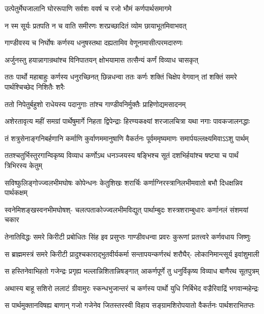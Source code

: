 \twolineshloka
{उत्पेतुर्मेघजालानि घोररूपाणि सर्वशः}
{ववर्ष च रजो भौमं कर्णपार्थसमागमे}


\twolineshloka
{न स्म सूर्यः प्रतपति न च वाति समीरणः}
{शरप्रच्छादितं व्योम छायाभूतमिवाभवत्}


\twolineshloka
{गाण्डीवस्य च निर्घोषः कर्णस्य धनुषस्तथा}
{दह्यतामिव वेणूनामासीत्परमदारुणः}


\twolineshloka
{अर्जुनस्तु हयान्नागान्रथांश्च विनिपातयन्}
{क्षोभयामास तत्सैन्यं कर्णं विव्याध चासकृत्}


\threelineshloka
{ततः पार्थो महाबाहुः कर्णस्य धनुरच्छिनत्}
{छिन्नधन्वा ततः कर्णः शक्तिं चिक्षेप वेगवान्}
{तां शक्तिं समरे पार्थश्चिच्छेद निशितैः शरैः}


\twolineshloka
{ततो निपेतुर्बहुशो राधेयस्य पदानुगाः}
{तांश्च गाण्डीवनिर्मुक्तैः प्राहिणोद्यमसादनम्}


\fourlineindentedshloka
{अशेरतावृत्य महीं समग्रां}
{पार्थेषुमार्गे निहता द्विपेन्द्राः}
{हिरण्यकक्ष्यां शरजालचित्रा}
{यथा नगाः पावकजालनद्धाः}


\fourlineindentedshloka
{तं शत्रुसेनाङ्गनिबर्हणानि}
{कर्माणि कुर्वाणममानुषाणि}
{वैकर्तनः पूर्वममृष्यमाणः}
{समार्पयल्लक्ष्यमिवाऽऽशु पार्थम्}


\fourlineindentedshloka
{ततश्चतुर्भिस्तुरगान्विकृष्य}
{विव्याध कर्णोऽथ धनञ्जयस्य}
{षङ्भिश्च सूतं दशभिर्हयांश्च}
{षष्ट्या च पार्थं त्रिभिरस्य केतुम्}


\fourlineindentedshloka
{सविष्फुलिङ्गोज्ज्वलभीमघोषः}
{कोपेन्धनः केतुशिखः शरार्चिः}
{कर्णाग्निरस्त्रानिलभीमवातो}
{बभौ दिधक्षन्निव पार्थकक्षम्}


\fourlineindentedshloka
{स्वनेमिशङ्खस्वनभीमघोषश्-}
{चलत्पताकोज्ज्वलभीमविद्युत्}
{पार्थाम्बुदः शस्त्रशराम्बुधारः}
{कर्णानलं संशमयां चकार}


\fourlineindentedshloka
{तेनातिविद्धः समरे किरीटी}
{प्रबोधितः सिंह इव प्रसुप्तः}
{गाण्डीवधन्वा प्रवरः कुरूणां}
{प्रतत्त्वरे कर्णवधाय जिष्णुः}


\fourlineindentedshloka
{स ब्राह्ममस्त्रं समरे किरीटी}
{प्रादुश्चकाराद्भुतवीर्यकर्मा}
{सन्तापयन्कर्णरथं शरौघैर्-}
{लोकानिमान्त्सूर्य इवांशुमाली}


\fourlineindentedshloka
{स हस्तिनेवाभिहतो गजेन्द्रः}
{प्रगृह्य भल्लान्निशितान्निषङ्गात्}
{आकर्णपूर्णे तु धनुर्विकृष्य}
{विव्याध बाणैरथ सूतपुत्रम्}


\fourlineindentedshloka
{अथास्य बाहू सशिरो ललाटं}
{ग्रीवामुरः स्कन्धभुजान्तरं च}
{कर्णस्य पार्थो युधि निर्बिभेद}
{वज्रैरिवाद्रिं भगवान्महेन्द्रः}


\fourlineindentedshloka
{स पार्थमुक्तानविषह्य बाणान्}
{गजो गजेनेव जितस्तरस्वी}
{विहाय सङ्ग्रामशिरोपयातो}
{वैकर्तनः पार्थशराभितप्तः}

